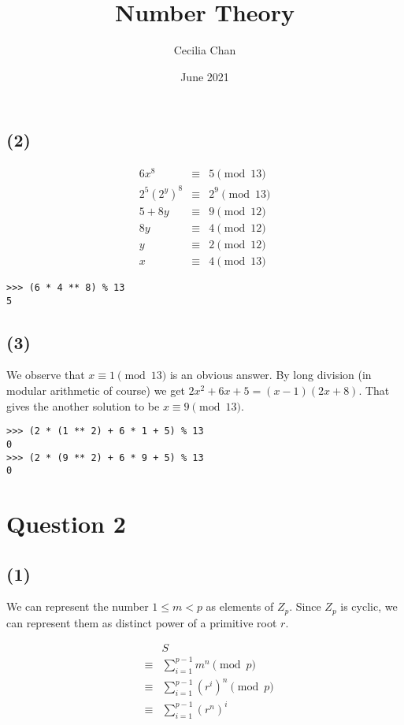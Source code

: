 \documentclass{article}
\title{Number Theory}
\author{Cecilia Chan}
\date{June 2021}
\begin{document}


\maketitle


\subsection*{(2)}
\begin{eqnarray*}
         6x^8 & \equiv & 5   \pmod{13} \\
  2^5 (2^y)^8 & \equiv & 2^9 \pmod{13} \\
       5 + 8y & \equiv & 9   \pmod{12} \\
           8y & \equiv & 4   \pmod{12} \\
            y & \equiv & 2   \pmod{12} \\
            x & \equiv & 4   \pmod{13}
\end{eqnarray*}
\begin{verbatim}
>>> (6 * 4 ** 8) % 13
5
\end{verbatim}

\subsection*{(3)}
We observe that $ x \equiv 1 \pmod{13} $ is an obvious answer. By long division (in modular arithmetic of course) we get $ 2x^2 + 6x + 5 = (x - 1)(2x + 8) $. That gives the another solution to be $ x \equiv 9 \pmod{13} $.
\begin{verbatim}
>>> (2 * (1 ** 2) + 6 * 1 + 5) % 13
0
>>> (2 * (9 ** 2) + 6 * 9 + 5) % 13
0
\end{verbatim}

\section*{Question 2}
\subsection*{(1)}
We can represent the number $ 1 \le m < p $ as elements of $ Z_p $. Since $ Z_p $ is cyclic, we can represent them as distinct power of a primitive root $ r $.

\begin{eqnarray*}
  &      & S                                         \\
  &\equiv& \sum\limits_{i = 1}^{p-1}m^n     \pmod{p} \\
  &\equiv& \sum\limits_{i = 1}^{p-1}(r^i)^n \pmod{p} \\
  &\equiv& \sum\limits_{i = 1}^{p-1}(r^n)^i
\end{eqnarray*}
\end{document}
